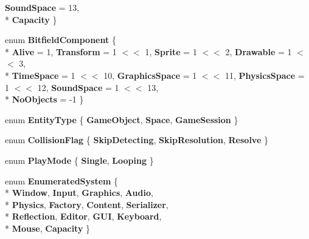 \begin{DoxyCompactItemize}
{\bfseries Sound\-Space} = 13, 
\\*
{\bfseries Capacity}
 \}
\item 
enum {\bfseries Bitfield\-Component} \{ \\*
{\bfseries Alive} = 1, 
{\bfseries Transform} = 1 $<$$<$ 1, 
{\bfseries Sprite} = 1 $<$$<$ 2, 
{\bfseries Drawable} = 1 $<$$<$ 3, 
\\*
{\bfseries Time\-Space} = 1 $<$$<$ 10, 
{\bfseries Graphics\-Space} = 1 $<$$<$ 11, 
{\bfseries Physics\-Space} = 1 $<$$<$ 12, 
{\bfseries Sound\-Space} = 1 $<$$<$ 13, 
\\*
{\bfseries No\-Objects} = -\/1
 \}
\item 
enum {\bfseries Entity\-Type} \{ {\bfseries Game\-Object}, 
{\bfseries Space}, 
{\bfseries Game\-Session}
 \}
\item 
enum {\bfseries Collision\-Flag} \{ {\bfseries Skip\-Detecting}, 
{\bfseries Skip\-Resolution}, 
{\bfseries Resolve}
 \}
\item 
enum {\bfseries Play\-Mode} \{ {\bfseries Single}, 
{\bfseries Looping}
 \}
\item 
enum {\bfseries Enumerated\-System} \{ \\*
{\bfseries Window}, 
{\bfseries Input}, 
{\bfseries Graphics}, 
{\bfseries Audio}, 
\\*
{\bfseries Physics}, 
{\bfseries Factory}, 
{\bfseries Content}, 
{\bfseries Serializer}, 
\\*
{\bfseries Reflection}, 
{\bfseries Editor}, 
{\bfseries G\-U\-I}, 
{\bfseries Keyboard}, 
\\*
{\bfseries Mouse}, 
{\bfseries Capacity}
 \}
\end{DoxyCompactItemize}
